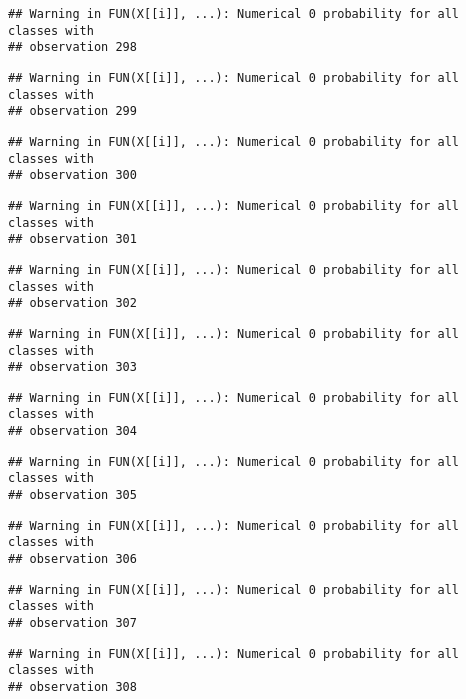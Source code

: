 \documentclass[
]{article}
\begin{document}
\begin{verbatim}
## Warning in FUN(X[[i]], ...): Numerical 0 probability for all classes with
## observation 298
\end{verbatim}

\begin{verbatim}
## Warning in FUN(X[[i]], ...): Numerical 0 probability for all classes with
## observation 299
\end{verbatim}

\begin{verbatim}
## Warning in FUN(X[[i]], ...): Numerical 0 probability for all classes with
## observation 300
\end{verbatim}

\begin{verbatim}
## Warning in FUN(X[[i]], ...): Numerical 0 probability for all classes with
## observation 301
\end{verbatim}

\begin{verbatim}
## Warning in FUN(X[[i]], ...): Numerical 0 probability for all classes with
## observation 302
\end{verbatim}

\begin{verbatim}
## Warning in FUN(X[[i]], ...): Numerical 0 probability for all classes with
## observation 303
\end{verbatim}

\begin{verbatim}
## Warning in FUN(X[[i]], ...): Numerical 0 probability for all classes with
## observation 304
\end{verbatim}

\begin{verbatim}
## Warning in FUN(X[[i]], ...): Numerical 0 probability for all classes with
## observation 305
\end{verbatim}

\begin{verbatim}
## Warning in FUN(X[[i]], ...): Numerical 0 probability for all classes with
## observation 306
\end{verbatim}

\begin{verbatim}
## Warning in FUN(X[[i]], ...): Numerical 0 probability for all classes with
## observation 307
\end{verbatim}

\begin{verbatim}
## Warning in FUN(X[[i]], ...): Numerical 0 probability for all classes with
## observation 308
\end{verbatim}
\end{document}
